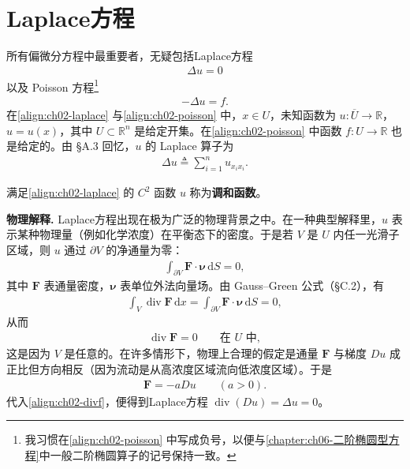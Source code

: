 \documentclass[../../main.tex]{subfiles}
\begin{document}
\section{Laplace方程}\label{section:ch02-laplace}

所有偏微分方程中最重要者，无疑包括Laplace方程
\begin{align}\label{align:ch02-laplace}
\Delta u=0
\end{align}
以及 Poisson 方程\footnote{我习惯在\eqref{align:ch02-poisson} 中写成负号，以便与\cref{chapter:ch06-二阶椭圆型方程}中一般二阶椭圆算子的记号保持一致。}
\begin{align}\label{align:ch02-poisson}
-\Delta u=f.
\end{align}
在\eqref{align:ch02-laplace} 与\eqref{align:ch02-poisson} 中，$x\in U$，未知函数为 $u:\overline{U}\to\mathbb{R}$，$u=u(x)$，其中 $U\subset\mathbb{R}^n$ 是给定开集。在\eqref{align:ch02-poisson} 中函数 $f:U\to\mathbb{R}$ 也是给定的。由 \S A.3 回忆，$u$ 的 Laplace 算子为
\begin{align*}
\Delta u\triangleq\sum_{i=1}^n u_{x_i x_i}.
\end{align*}

\begin{definition}\label{definition:ch02-harmonic}
满足\eqref{align:ch02-laplace} 的 $C^2$ 函数 $u$ 称为\textbf{调和函数}。
\end{definition}

\textbf{物理解释.} Laplace方程出现在极为广泛的物理背景之中。在一种典型解释里，$u$ 表示某种物理量（例如化学浓度）在平衡态下的密度。于是若 $V$ 是 $U$ 内任一光滑子区域，则 $u$ 通过 $\partial V$ 的净通量为零：
\begin{align*}
\int_{\partial V}\mathbf{F}\cdot\boldsymbol{\nu}\,\mathrm{d}S=0,
\end{align*}
其中 $\mathbf{F}$ 表通量密度，$\boldsymbol{\nu}$ 表单位外法向量场。由 Gauss--Green 公式（\S C.2），有
\begin{align*}
\int_V \operatorname{div}\mathbf{F}\,\mathrm{d}x=\int_{\partial V}\mathbf{F}\cdot\boldsymbol{\nu}\,\mathrm{d}S=0,
\end{align*}
从而
\begin{align}\label{align:ch02-divf}
\operatorname{div}\mathbf{F}=0 \qquad \text{在 }U\text{ 中},
\end{align}
这是因为 $V$ 是任意的。在许多情形下，物理上合理的假定是通量 $\mathbf{F}$ 与梯度 $Du$ 成正比但方向相反（因为流动是从高浓度区域流向低浓度区域）。于是
\begin{align}\label{align:ch02-flux}
\mathbf{F}=-aDu \qquad (a>0).
\end{align}
代入\eqref{align:ch02-divf}，便得到Laplace方程 $\operatorname{div}(Du)=\Delta u=0$。
\end{document}
